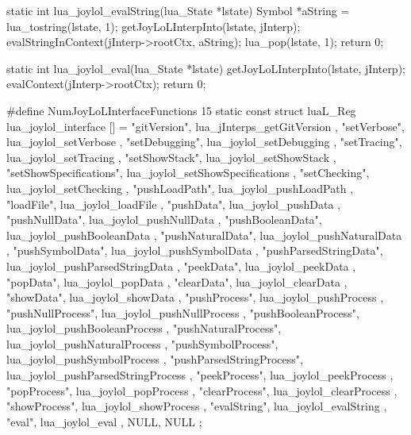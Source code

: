 \startCCode
static int lua_joylol_evalString(lua_State *lstate) {
  Symbol *aString = lua_tostring(lstate, 1);
  getJoyLoLInterpInto(lstate, jInterp);
  evalStringInContext(jInterp->rootCtx, aString);
  lua_pop(lstate, 1);
  return 0;
}

static int lua_joylol_eval(lua_State *lstate) {
  getJoyLoLInterpInto(lstate, jInterp);
  evalContext(jInterp->rootCtx);
  return 0;
}
\stopCCode

\startCCode
#define NumJoyLoLInterfaceFunctions 15
static const struct luaL_Reg lua_joylol_interface [] = {
  { "gitVersion",              lua_jInterps_getGitVersion         },
  { "setVerbose",              lua_joylol_setVerbose              },
  { "setDebugging",            lua_joylol_setDebugging            },
  { "setTracing",              lua_joylol_setTracing              },
  { "setShowStack",            lua_joylol_setShowStack            },
  { "setShowSpecifications",   lua_joylol_setShowSpecifications   },
  { "setChecking",             lua_joylol_setChecking             },
  { "pushLoadPath",            lua_joylol_pushLoadPath            },
  { "loadFile",                lua_joylol_loadFile                },
  { "pushData",                lua_joylol_pushData                },
  { "pushNullData",            lua_joylol_pushNullData            },
  { "pushBooleanData",         lua_joylol_pushBooleanData         },
  { "pushNaturalData",         lua_joylol_pushNaturalData         },
  { "pushSymbolData",          lua_joylol_pushSymbolData          },
  { "pushParsedStringData",    lua_joylol_pushParsedStringData    },
  { "peekData",                lua_joylol_peekData                },
  { "popData",                 lua_joylol_popData                 },
  { "clearData",               lua_joylol_clearData               },
  { "showData",                lua_joylol_showData                },
  { "pushProcess",             lua_joylol_pushProcess             },
  { "pushNullProcess",         lua_joylol_pushNullProcess         },
  { "pushBooleanProcess",      lua_joylol_pushBooleanProcess      },
  { "pushNaturalProcess",      lua_joylol_pushNaturalProcess      },
  { "pushSymbolProcess",       lua_joylol_pushSymbolProcess       },
  { "pushParsedStringProcess", lua_joylol_pushParsedStringProcess },
  { "peekProcess",             lua_joylol_peekProcess             },
  { "popProcess",              lua_joylol_popProcess              },
  { "clearProcess",            lua_joylol_clearProcess            },
  { "showProcess",             lua_joylol_showProcess             },
  { "evalString",              lua_joylol_evalString              },
  { "eval",                    lua_joylol_eval                    },
  {NULL, NULL}
};
\stopCCode
